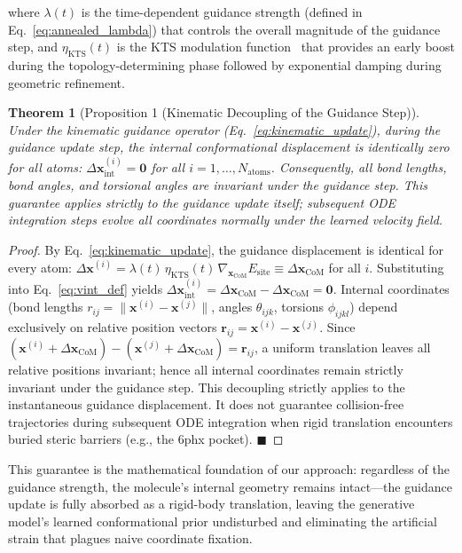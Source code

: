 \documentclass{article}
\newtheorem{theorem}{Theorem}
\newcommand{\Deltax}{\ensuremath{\Delta\bm{x}}}
\begin{document}
where $\lambda(t)$ is the time-dependent guidance strength (defined in
Eq.~\ref{eq:annealed_lambda}) that controls the overall magnitude of the
guidance step, and $\eta_{\text{KTS}}(t)$ is the KTS modulation
function~\cite{li2026kpe} that provides an early boost during the
topology-determining phase followed by exponential damping during geometric
refinement.

\begin{theorem}[Proposition 1 (Kinematic Decoupling of the Guidance Step)]
\label{thm:zero_strain}
Under the kinematic guidance operator (Eq.~\ref{eq:kinematic_update}),
\emph{during the guidance update step}, the internal conformational
displacement is identically zero for all atoms:
$\Deltax_{\text{int}}^{(i)} = \bm{0}$ for all $i = 1, \ldots, N_{\text{atoms}}$.
Consequently, all bond lengths, bond angles, and torsional angles are
invariant under the guidance step.  This guarantee applies strictly to the
guidance update itself; subsequent ODE integration steps evolve all
coordinates normally under the learned velocity field.
\end{theorem}

\begin{proof}
By Eq.~\ref{eq:kinematic_update}, the guidance displacement is identical for
every atom:
$\Deltax^{(i)} = \lambda(t)\,\eta_{\text{KTS}}(t)\,\nabla_{\bm{x}_{\text{CoM}}}E_{\text{site}}
\equiv \Deltax_{\text{CoM}}$ for all $i$.
Substituting into Eq.~\ref{eq:vint_def} yields
$\Deltax_{\text{int}}^{(i)} = \Deltax_{\text{CoM}} - \Deltax_{\text{CoM}} =
\bm{0}$.  Internal coordinates (bond lengths $r_{ij} =
\|\bm{x}^{(i)} - \bm{x}^{(j)}\|$, angles $\theta_{ijk}$, torsions
$\phi_{ijkl}$) depend exclusively on relative position vectors
$\bm{r}_{ij} = \bm{x}^{(i)} - \bm{x}^{(j)}$.  Since
$(\bm{x}^{(i)} + \Deltax_{\text{CoM}}) - (\bm{x}^{(j)} + \Deltax_{\text{CoM}}) =
\bm{r}_{ij}$, a uniform translation leaves all relative positions invariant;
hence all internal coordinates remain strictly invariant under the guidance
step.  This decoupling strictly applies to the instantaneous guidance
displacement.  It does not guarantee collision-free trajectories during
subsequent ODE integration when rigid translation encounters buried
steric barriers (e.g., the 6phx pocket). \hfill$\blacksquare$
\end{proof}

This guarantee is the mathematical foundation of our approach: regardless of
the guidance strength, the molecule's internal geometry remains intact---the
guidance update is fully absorbed as a rigid-body translation, leaving the
generative model's learned conformational prior undisturbed and eliminating
the artificial strain that plagues naive coordinate fixation.
\end{document}

